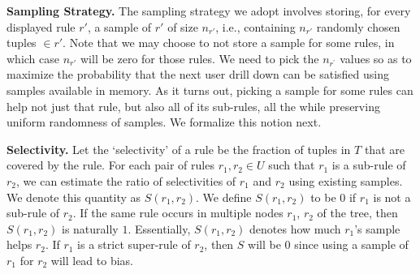 \documentclass[10pt,journal,compsoc]{IEEEtran}
\newcounter{prob}
\newcommand{\stitle}[1]{\vspace{0.5em}\noindent\textbf{#1}}
\begin{document}
{%

\stitle{Sampling Strategy.} The sampling strategy we adopt involves storing, 
for every displayed rule $r'$, a sample of $r'$ of size $n_{r'}$, i.e., 
containing $n_{r'}$ randomly chosen tuples $\in r'$.
Note that we may choose to not store a sample for some rules, in which case $n_{r'}$
will be zero for those rules. 
We need to pick the $n_{r^{\prime}}$ values so as to maximize the probability that the next user drill down can be satisfied using samples available in memory. 
As it turns out, picking a sample for some rules can help not just that rule, but
also all of its sub-rules, all the while preserving uniform randomness of samples. We formalize this notion next.


\stitle{Selectivity.} 
Let the `selectivity' of a rule be the fraction of tuples in $T$ that are covered by the rule. 
For each pair of rules $r_1, r_2 \in U$ such that $r_1$ is a sub-rule of $r_2$, we can estimate the ratio of selectivities of $r_1$ and $r_2$ using existing samples. We denote this quantity as $S(r_1, r_2)$. 
We define $S(r_1, r_2)$ to be $0$ if $r_1$ is not a sub-rule of $r_2$. 
If the same rule occurs in multiple nodes $r_1$, $r_2$ of the tree, then $S(r_1, r_2)$ is naturally $1$. 
Essentially, $S(r_1, r_2)$ denotes how much $r_1$'s sample helps $r_2$. 
If $r_1$ is a strict super-rule of $r_2$, then $S$ will be $0$ since using a sample of $r_1$
for $r_2$ will lead to bias.

}
\end{document}
